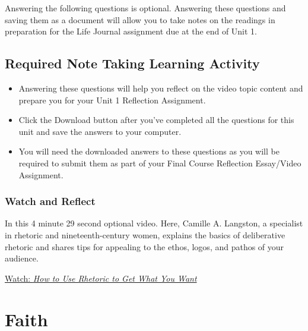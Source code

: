 \documentclass[
]{book}
\providecommand{\tightlist}{%
  \setlength{\itemsep}{0pt}\setlength{\parskip}{0pt}}
\begin{document}
\begin{reflect}
Answering the following questions is optional. Answering these questions and saving them as a document will allow you to take notes on the readings in preparation for the Life Journal assignment due at the end of Unit 1.
\end{reflect}

\hypertarget{required-note-taking-learning-activity}{%
\section*{Required Note Taking Learning Activity}\label{required-note-taking-learning-activity}}

\begin{reflect}
\begin{itemize}
\tightlist
\item
  Answering these questions will help you reflect on the video topic content and prepare you for your Unit 1 Reflection Assignment.
\item
  Click the Download button after you've completed all the questions for this unit and save the answers to your computer.
\item
  You will need the downloaded answers to these questions as you will be required to submit them as part of your Final Course Reflection Essay/Video Assignment.
\end{itemize}
\end{reflect}

\hypertarget{watch-and-reflect-8}{%
\subsection*{Watch and Reflect}\label{watch-and-reflect-8}}

\begin{reflect}
In this 4 minute 29 second optional video. Here, Camille A. Langston, a specialist in rhetoric and nineteenth-century women, explains the basics of deliberative rhetoric and shares tips for appealing to the ethos, logos, and pathos of your audience.

\href{https://www.youtube.com/watch?v=3klMM9BkW5o}{Watch: \emph{How to Use Rhetoric to Get What You Want}}
\end{reflect}

\hypertarget{faith}{%
\chapter{Faith}\label{faith}}
\end{document}
